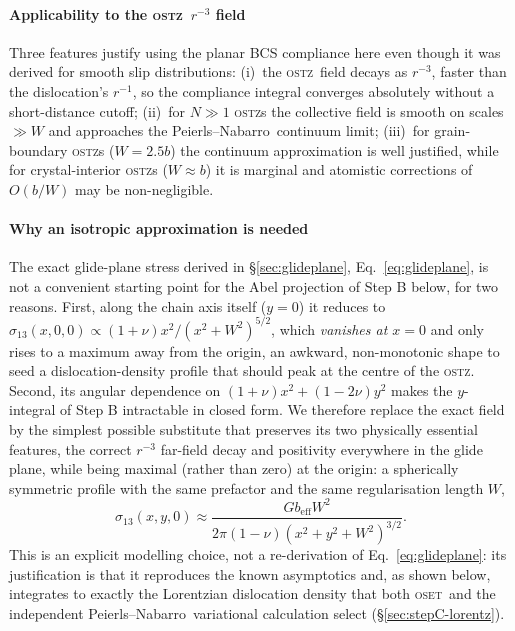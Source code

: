 \documentclass[3p]{elsarticle}
\newcommand{\OSTZ}{\textsc{ostz}}
\newcommand{\OSET}{\textsc{oset}}
\newcommand{\beff}{b_\mathrm{eff}}
\newcommand{\PN}{Peierls--Nabarro}
\begin{document}
\paragraph{Applicability to the \OSTZ\ $r^{-3}$ field} Three features
justify using the planar BCS compliance here even though it was
derived for smooth slip distributions: (i)~the \OSTZ\ field decays
as $r^{-3}$, faster than the dislocation's $r^{-1}$, so the
compliance integral converges absolutely without a short-distance
cutoff; (ii)~for $N\gg1$ \OSTZ s the collective field is smooth on
scales $\gg W$ and approaches the \PN\ continuum limit; (iii)~for
grain-boundary \OSTZ s ($W=2.5b$) the continuum approximation is
well justified, while for crystal-interior \OSTZ s ($W\approx b$) it
is marginal and atomistic corrections of $O(b/W)$ may be
non-negligible.
\paragraph{Why an isotropic approximation is needed} The exact
glide-plane stress derived in \S\ref{sec:glideplane},
Eq.~\eqref{eq:glideplane}, is not a convenient starting point for
the Abel projection of Step B below, for two reasons. First, along
the chain axis itself ($y=0$) it reduces to
$\sigma_{13}(x,0,0)\propto(1+\nu)x^2/(x^2+W^2)^{5/2}$, which
\emph{vanishes at $x=0$} and only rises to a maximum away from the
origin, an awkward, non-monotonic shape to seed a dislocation-density
profile that should peak at the centre of the \OSTZ. Second, its
angular dependence on $(1+\nu)x^2+(1-2\nu)y^2$ makes the $y$-integral
of Step B intractable in closed form. We therefore replace the exact
field by the simplest possible substitute that preserves its two
physically essential features, the correct $r^{-3}$ far-field decay
and positivity everywhere in the glide plane, while being maximal
(rather than zero) at the origin: a spherically symmetric profile
with the same prefactor and the same regularisation length $W$,
\begin{equation}
  \sigma_{13}(x,y,0)\approx
  \frac{G\beff W^2}{2\pi(1-\nu)(x^2+y^2+W^2)^{3/2}}.
  \label{eq:gpisotropic}
\end{equation}
This is an explicit modelling choice, not a re-derivation of
Eq.~\eqref{eq:glideplane}: its justification is that it reproduces
the known asymptotics and, as shown below, integrates to exactly the
Lorentzian dislocation density that both \OSET\ and the independent
\PN\ variational calculation select (\S\ref{sec:stepC-lorentz}).
\end{document}
